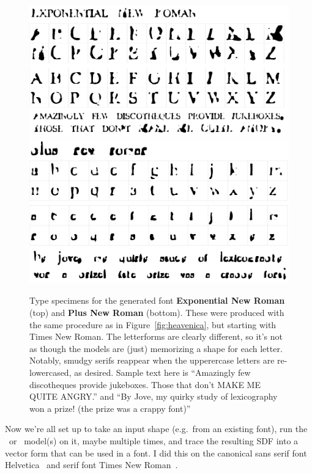 \documentclass[twocolumn]{article}
\begin{document}
\begin{figure}[tp]
\centering
\includegraphics[width=0.9 \linewidth]{expnewroman} \\[0.5in]
\includegraphics[width=0.9 \linewidth]{plusnewroman} \\
\caption{
  Type specimens for the generated font {\bf Exponential New Roman} (top)
  and {\bf Plus New Roman} (bottom). These were produced with
  the same procedure as in Figure~\ref{fig:heavenica}, but starting
  with Times New Roman. The letterforms are clearly different, so
  it's not as though the models are (just) memorizing a shape for
  each letter. Notably, smudgy serifs reappear when the upperercase letters
  are re-lowercased, as desired.
  Sample text here is ``Amazingly few discotheques provide jukeboxes.
  Those that don't MAKE ME QUITE ANGRY.'' and 
  ``By Jove, my quirky study of lexicography won a prize! (the prize
  was a crappy font)''
} \label{fig:roman}
\end{figure}


\medskip
Now we're all set up to take an input shape (e.g.~from an existing
font), run the \makeuppercase\ or \makelowercase\ model(s) on it,
maybe multiple times, and trace the resulting SDF into a vector form
that can be used in a font. I did this on the canonical sans serif
font Helvetica~\cite{helvetica} and serif font Times New
Roman~\cite{timesnewroman}.
\end{document}
